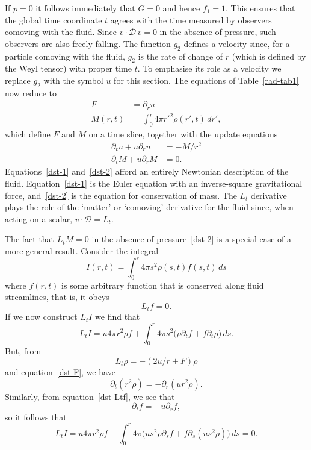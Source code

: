 \documentclass[a4paper]{article}
\numberwithin{equation}{section}
\newcommand{\dt}{\! \cdot \!}
\newcommand{\cld}{{\mathcal{D}}}
\newcommand{\dif}[1]{\partial_{#1}}
\newcommand{\dr}{\partial_r}
\newcommand{\dift}{\partial_t}
\begin{document}
If $p=0$ it follows immediately that $G=0$ and hence $f_1=1$.  This
ensures that the global time coordinate $t$ agrees with the time
measured by observers comoving with the fluid.  Since $v\dt\cld\, v=0$
in the absence of pressure, such observers are also freely falling.
The function $g_2$ defines a velocity since, for a particle comoving
with the fluid, $g_2$ is the rate of change of $r$ (which is defined
by the Weyl tensor) with proper time $t$.  To emphasise its role as a
velocity we replace $g_2$ with the symbol $u$ for this section.  The
equations of Table~\ref{rad-tab1} now reduce to
%
\begin{align}
F &= \dr u \label{dst-F} \\ 
M(r,t) &= \int_0^r 4 \pi {r'}^2 \rho(r',t) \, dr', \label{dst-M}
\end{align}
%
which define $F$ and $M$ on a time slice, together with the update
equations
%
\begin{align}
\partial_t u + u \dr u &= - M/r^2 \label{dst-1} \\
\partial_t M + u \dr M &= 0. \label{dst-2}
\end{align}
%
Equations~\eqref{dst-1} and~\eqref{dst-2} afford an entirely Newtonian
description of the fluid.  Equation~\eqref{dst-1} is the Euler equation
with an inverse-square gravitational force, and~\eqref{dst-2} is the
equation for conservation of mass. The $L_t$ derivative plays the role
of the `matter' or `comoving' derivative for the fluid since, when
acting on a scalar, $v\dt\cld = L_t$.


The fact that $L_t M=0$ in the absence of pressure~\eqref{dst-2} is a
special case of a more general result.  Consider the integral
%
\begin{equation}
I(r,t) = \int_0^r 4 \pi s^2 \rho(s,t) f(s,t) \, ds 
\end{equation}
%
where $f(r,t)$ is some arbitrary function that is conserved along
fluid streamlines, that is, it obeys 
%
\begin{equation}
L_t f = 0.
\label{dst-Ltf}
\end{equation}
%
If we now construct $L_t I$ we find that
%
\begin{equation}
L_t I = u 4 \pi r^2 \rho f + \int_0^r 4\pi s^2 \bigl( \rho \dift f  +
f \dift \rho \bigr) \, ds.
\end{equation}
%
But, from
%
\begin{equation}
L_t \rho = -( 2 u /r + F ) \rho
\end{equation}
%
and equation~\eqref{dst-F}, we have
%
\begin{equation}
\dift(r^2 \rho) = - \dr(u r^2 \rho).
\end{equation}
%
Similarly, from equation~\eqref{dst-Ltf}, we see that
%
\begin{equation}
\dift f = - u \dr f,
\end{equation}
%
so it follows that
%
\begin{equation}
L_t I = u 4\pi r^2 \rho f - \int_0^r 4 \pi \bigl( u s^2 \rho
\dif{s} f + f \dif{s} (u s^2 \rho) \bigr) \, ds = 0.
\end{equation} 
%
\end{document}
